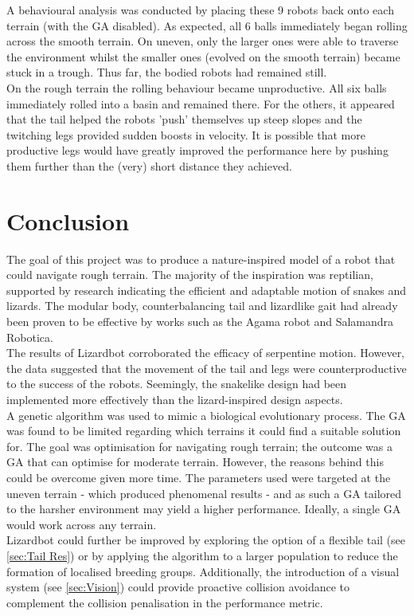 \documentclass{article}
\begin{document}
A behavioural analysis was conducted by placing these 9 robots back onto each terrain (with the GA disabled). As expected, all 6 balls immediately began rolling across the smooth terrain. On uneven, only the larger ones were able to traverse the environment whilst the smaller ones (evolved on the smooth terrain) became stuck in a trough. Thus far, the bodied robots had remained still. \\
On the rough terrain the rolling behaviour became unproductive. All six balls immediately rolled into a basin and remained there. For the others, it appeared that the tail helped the robots 'push' themselves up steep slopes and the twitching legs provided sudden boosts in velocity. It is possible that more productive legs would have greatly improved the performance here by pushing them further than the (very) short distance they achieved.

\newpage
\section{Conclusion}
\label{sec:Conclusion}

The goal of this project was to produce a nature-inspired model of a robot that could navigate rough terrain. The majority of the inspiration was reptilian, supported by research indicating the efficient and adaptable motion of snakes and lizards. The modular body, counterbalancing tail and lizardlike gait had already been proven to be effective by works such as the Agama robot and Salamandra Robotica. \\

The results of Lizardbot corroborated the efficacy of serpentine motion. However, the data suggested that the movement of the tail and legs were counterproductive to the success of the robots. Seemingly, the snakelike design had been implemented more effectively than the lizard-inspired design aspects.\\ 

A genetic algorithm was used to mimic a biological evolutionary process. The GA was found to be limited regarding which terrains it could find a suitable solution for. The goal was optimisation for navigating rough terrain; the outcome was a GA that can optimise for moderate terrain. However, the reasons behind this could be overcome given more time. The parameters used were targeted at the uneven terrain - which produced phenomenal results - and as such a GA tailored to the harsher environment may yield a higher performance. Ideally, a single GA would work across any terrain.\\
Lizardbot could further be improved by exploring the option of a flexible tail (see \ref{sec:Tail Res}) or by applying the algorithm to a larger population to reduce the formation of localised breeding groups. Additionally, the introduction of a visual system (see \ref{sec:Vision}) could provide proactive collision avoidance to complement the collision penalisation in the performance metric. \\
\end{document}
